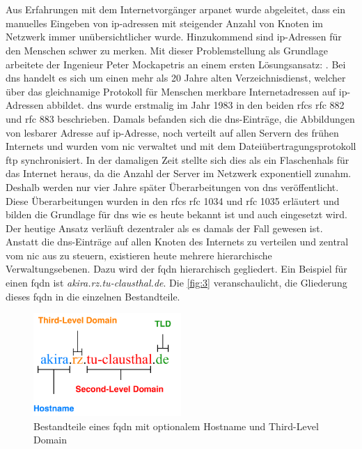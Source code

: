 \documentclass[titlepage]{report}
\begin{document}
\section*{}
Aus Erfahrungen mit dem Internetvorgänger \gls{arpanet} wurde
abgeleitet, dass ein manuelles Eingeben von \gls{ip}\hyp{}adressen mit
steigender Anzahl von Knoten im Netzwerk immer unübersichtlicher wurde.
Hinzukommend sind \gls{ip}\hyp{}Adressen für den Menschen schwer zu
merken. Mit dieser Problemstellung als Grundlage arbeitete der Ingenieur
Peter Mockapetris an einem ersten Lösungsansatz: .
Bei \gls{dns} handelt es sich um einen mehr als 20 Jahre alten
Verzeichnisdienst, welcher über das gleichnamige Protokoll für Menschen
merkbare Internetadressen auf \gls{ip}\hyp{}Adressen abbildet.
\gls{dns} wurde erstmalig im Jahr 1983 in den beiden \glspl{rfc}
\gls{rfc} 882\cite{RFC0882} und \gls{rfc} 883\cite{RFC0883} beschrieben.
Damals befanden sich die \gls{dns}\hyp{}Einträge, die Abbildungen von
lesbarer Adresse auf \gls{ip}\hyp{}Adresse, noch verteilt auf
allen Servern des frühen Internets und wurden vom \gls{nic} verwaltet
und mit dem Dateiübertragungsprotokoll \gls{ftp}
synchronisiert\cite{RFC1034}. In der damaligen Zeit stellte sich dies
als ein Flaschenhals für das Internet heraus, da die Anzahl der Server
im Netzwerk exponentiell zunahm. Deshalb werden nur vier Jahre später
Überarbeitungen von \gls{dns} veröffentlicht. Diese Überarbeitungen
wurden in den \glspl{rfc} \gls{rfc} 1034 und \gls{rfc} 1035 erläutert
und bilden die Grundlage für \gls{dns} wie es heute bekannt ist und auch
eingesetzt wird. Der heutige Ansatz verläuft dezentraler als es damals
der Fall gewesen ist. Anstatt die \gls{dns}\hyp{}Einträge auf allen
Knoten des Internets zu verteilen und zentral vom \gls{nic} aus zu
steuern, existieren heute mehrere hierarchische Verwaltungsebenen. Dazu
wird der \gls{fqdn} hierarchisch gegliedert. Ein Beispiel für einen
\gls{fqdn} ist \emph{akira.rz.tu-clausthal.de}. Die
\autoref{fig:3} veranschaulicht, die Gliederung dieses \gls{fqdn} in die
einzelnen Bestandteile.
\begin{figure}[H]
    \centering
    \includegraphics[width=0.5\textwidth]{figures/dnsname.pdf}
    \caption{Bestandteile eines \gls{fqdn} mit optionalem Hostname und Third-Level
    Domain}\label{fig:3}
\end{figure}
\end{document}
